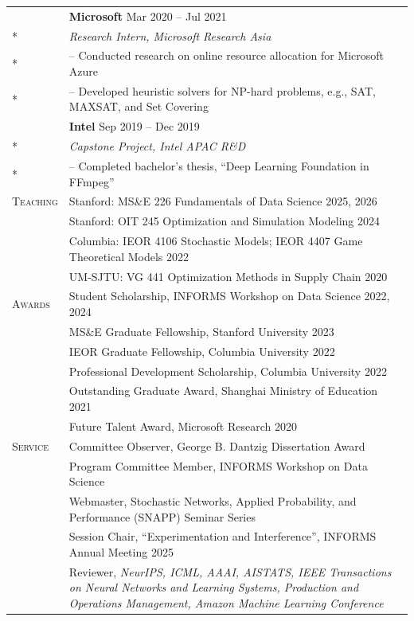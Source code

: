 \documentclass[letterpaper, 10pt]{article}
\newcommand{\cvsection}[1]{\nohyphens{\scshape #1}}
\newlength{\entrysep}   \setlength{\entrysep}{5pt}
\newlength{\sectionsep} \setlength{\sectionsep}{12pt}
\begin{document}
\begin{longtable}{p{}p{5.8in}}
& \textbf{Microsoft} \hfill Mar 2020 -- Jul 2021 \\*
& \textit{Research Intern, Microsoft Research Asia} \\*
& -- Conducted research on online resource allocation for Microsoft Azure \\*
& -- Developed heuristic solvers for NP-hard problems, e.g., SAT, MAXSAT, and Set Covering \\[\entrysep]

& \textbf{Intel} \hfill Sep 2019 -- Dec 2019 \\*
& \textit{Capstone Project, Intel APAC R\&D} \\*
& -- Completed bachelor's thesis, ``Deep Learning Foundation in FFmpeg'' \\[\sectionsep]


\cvsection{Teaching}
& Stanford: MS\&E 226 Fundamentals of Data Science \hfill 2025, 2026 \\
& Stanford: OIT 245 Optimization and Simulation Modeling \hfill 2024 \\
& Columbia: IEOR 4106 Stochastic Models; IEOR 4407 Game Theoretical Models \hfill 2022 \\
& UM-SJTU: VG 441 Optimization Methods in Supply Chain \hfill 2020 \\[\sectionsep]


\cvsection{Awards}
& Student Scholarship, INFORMS Workshop on Data Science \hfill 2022, 2024 \\
& MS\&E Graduate Fellowship, Stanford University \hfill 2023 \\
& IEOR Graduate Fellowship, Columbia University \hfill 2022 \\
& Professional Development Scholarship, Columbia University \hfill 2022 \\
& Outstanding Graduate Award, Shanghai Ministry of Education \hfill 2021 \\
& Future Talent Award, Microsoft Research \hfill 2020 \\[\sectionsep]


\cvsection{Service}
& Committee Observer, George B. Dantzig Dissertation Award \\
& Program Committee Member, INFORMS Workshop on Data Science \\
& Webmaster, Stochastic Networks, Applied Probability, and Performance (SNAPP) Seminar Series \\
& Session Chair, ``Experimentation and Interference'', INFORMS Annual Meeting 2025 \\
& Reviewer, \textit{NeurIPS, ICML, AAAI, AISTATS, IEEE Transactions on Neural Networks and Learning Systems, Production and Operations Management, Amazon Machine Learning Conference}


\end{longtable}
\end{document}
